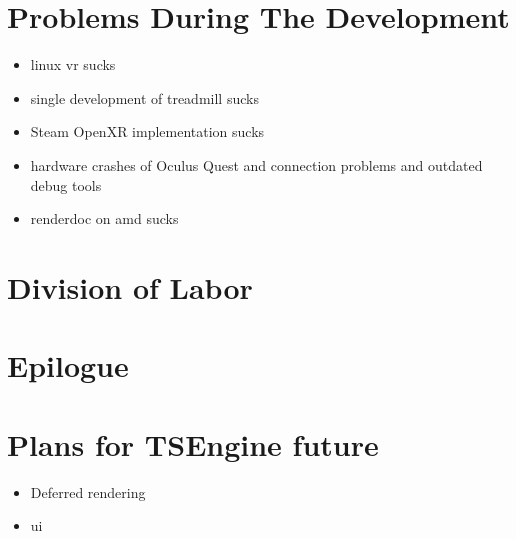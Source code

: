 \newpage
\section{Problems During The Development}
\label{sec:problems}
\begin{itemize}
    \item linux vr sucks
    \item single development of treadmill sucks
    \item Steam OpenXR implementation sucks
    \item hardware crashes of Oculus Quest and connection problems and outdated debug tools
    \item renderdoc on amd sucks
\end{itemize}
\newpage
\section{Division of Labor}
\section{Epilogue}
\section{Plans for TSEngine future}
\begin{itemize}
    \item Deferred rendering
    \item ui
\end{itemize}